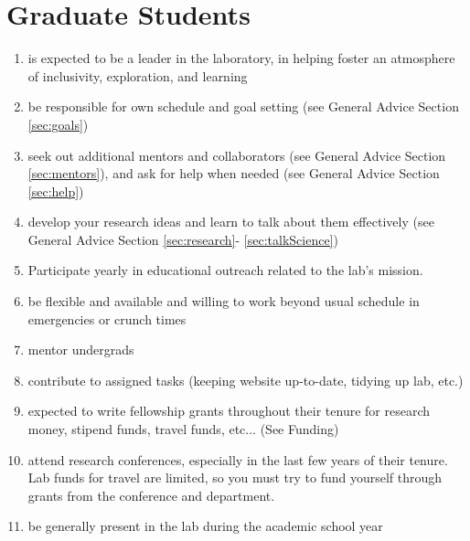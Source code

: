 \documentclass[12pt]{article}
\begin{document}
\section{Graduate Students}
\begin{enumerate}
\item is expected to be a leader in the laboratory, in helping foster
  an atmosphere of inclusivity, exploration, and  learning
\item be responsible for own schedule and goal setting (see General Advice
  Section \ref{sec:goals})
\item seek out additional mentors and collaborators (see General
  Advice Section \ref{sec:mentors}), and ask for help when needed (see
  General Advice Section \ref{sec:help})
\item develop your research ideas and learn to talk about them
  effectively (see General Advice Section \ref{sec:research}-
  \ref{sec:talkScience})
 \item Participate yearly in educational outreach related to the lab's mission.
\item be flexible and available and willing to work beyond usual
  schedule in emergencies or crunch times
\item mentor undergrads
\item contribute to assigned tasks (keeping website up-to-date,
  tidying up lab, etc.)
\item expected to write fellowship grants throughout their tenure for
  research money, stipend funds, travel funds, etc... (See Funding)
\item attend research conferences, especially in the last few years of
  their tenure. Lab funds for travel are limited, so you must try to
  fund yourself through grants from the conference and department.
\item be generally present in the lab during the academic school year
\end{enumerate}
\end{document}
